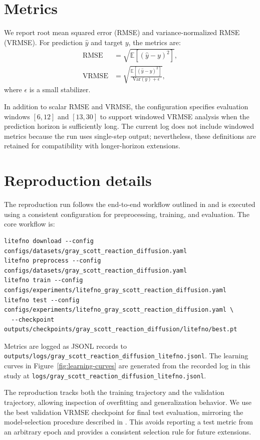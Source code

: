 \documentclass[11pt]{article}
\begin{document}
\section{Metrics}
We report root mean squared error (RMSE) and variance-normalized RMSE (VRMSE).
For prediction \(\hat{y}\) and target \(y\), the metrics are:
\begin{align}
\mathrm{RMSE} &= \sqrt{\mathbb{E}\left[(\hat{y} - y)^2\right]}, \\
\mathrm{VRMSE} &= \sqrt{\frac{\mathbb{E}\left[(\hat{y} - y)^2\right]}{\mathrm{Var}(y) + \epsilon}},
\end{align}
where \(\epsilon\) is a small stabilizer.

In addition to scalar RMSE and VRMSE, the configuration specifies evaluation
windows \([6, 12]\) and \([13, 30]\) to support windowed VRMSE analysis when the
prediction horizon is sufficiently long. The current log does not include
windowed metrics because the run uses single-step output; nevertheless, these
definitions are retained for compatibility with longer-horizon extensions.

\section{Reproduction details}
The reproduction run follows the end-to-end workflow outlined in
\cite{litefno2025} and is executed using a consistent configuration for
preprocessing, training, and evaluation. The core workflow is:
\begin{verbatim}
litefno download --config configs/datasets/gray_scott_reaction_diffusion.yaml
litefno preprocess --config configs/datasets/gray_scott_reaction_diffusion.yaml
litefno train --config configs/experiments/litefno_gray_scott_reaction_diffusion.yaml
litefno test --config configs/experiments/litefno_gray_scott_reaction_diffusion.yaml \
  --checkpoint outputs/checkpoints/gray_scott_reaction_diffusion/litefno/best.pt
\end{verbatim}
Metrics are logged as JSONL records to
\texttt{outputs/logs/gray\_scott\_reaction\_diffusion\_litefno.jsonl}. The
learning curves in Figure~\ref{fig:learning-curves} are generated from the
recorded log in this study at
\texttt{logs/gray\_scott\_reaction\_diffusion\_litefno.jsonl}.

The reproduction tracks both the training trajectory and the validation
trajectory, allowing inspection of overfitting and generalization behavior. We
use the best validation VRMSE checkpoint for final test evaluation, mirroring
the model-selection procedure described in \cite{litefno2025}. This avoids
reporting a test metric from an arbitrary epoch and provides a consistent
selection rule for future extensions.
\end{document}

